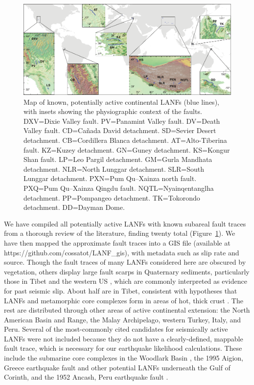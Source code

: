 \documentclass[twocolumn,grl]{AGUTeX}
\begin{document}
\begin{article}
\begin{figure}%
\noindent\includegraphics[width=40pc]{./figures/active_lanfs_map_insets.pdf}
\caption{Map of known, potentially active continental LANFs (blue lines), with
insets showing the physiographic context of the faults.  DXV=Dixie Valley
fault.  PV=Panamint Valley fault.  DV=Death Valley fault.  CD=Ca\~nada David
detachment.  SD=Sevier Desert detachment.  CB=Cordillera Blanca detachment.  
AT=Alto-Tiberina fault.  KZ=Kuzey detachment.  GN=Guney detachment.  
KS=Kongur Shan fault.  LP=Leo Pargil detachment.  GM=Gurla Mandhata 
detachment. NLR=North Lunggar detachment.  SLR=South Lunggar detachment.  
PXN=Pum Qu--Xainza north fault.  PXQ=Pum Qu--Xainza Qingdu fault. 
NQTL=Nyainqentanglha detachment.  PP=Pompangeo detachment.  
TK=Tokorondo detachment.  DD=Dayman Dome.}
\label{fig:lanf_map}
\end{figure}

We have compiled all potentially active LANFs with known subareal
fault traces from a thorough review of the literature, finding twenty
total (Figure~\ref{fig:lanf_map}).  We have then mapped the approximate fault
traces into a GIS file (available at https://github.com/cossatot/LANF\_gis), 
with metadata such as slip rate and source. Though the fault traces of many
LANFs considered here are obscured by vegetation, others
display large fault scarps in Quaternary sediments, particularly those in 
Tibet \citep[e.g.,][]{styron2013slr, kapp2005nqtl} and the
western US \citep[e.g.,][]{axen1999baja, hayman2003dv}, which are commonly
interpreted as evidence for past seismic slip.  About half are in Tibet,
consistent with hypotheses that LANFs and metamorphic core complexes
form in areas of hot, thick crust \citep [e.g.,][]{buck1991mcc}.  The
rest are distributed through other areas of active continental
extension: the North American Basin and Range, the Malay Archipelago,
western Turkey, Italy, and Peru. Several of the most-commonly cited
candidates for seismically active LANFs were not included because they
do not have a clearly-defined, mappable fault trace, which is
necessary for our earthquake likelihood calculations.  These include the 
submarine core complexes in the Woodlark Basin \citep{abers2001}, 
the 1995 Aigion, Greece earthquake fault \citep{bernard1997}
and other potential LANFs underneath the Gulf of Corinth, and the
1952 Ancash, Peru earthquake fault \citep{doser1987ancash}.



\end{article}
\end{document}
